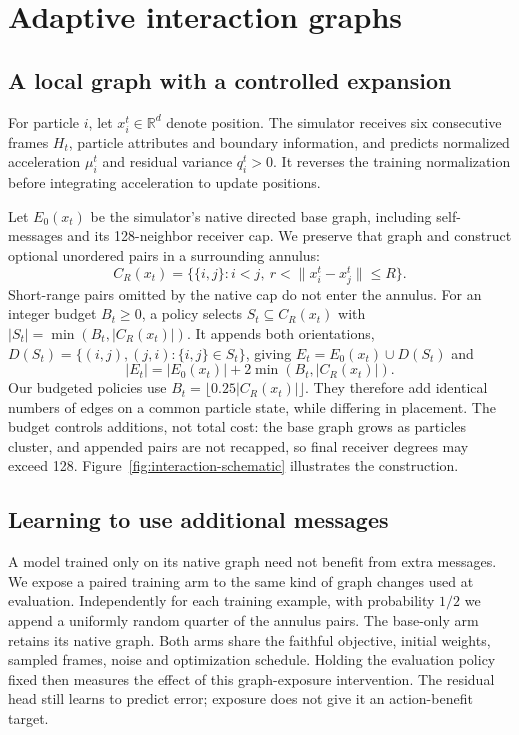 \section{Adaptive interaction graphs}
\subsection{A local graph with a controlled expansion}
For particle $i$, let $x_i^t\in\mathbb R^d$ denote position. The simulator receives six consecutive frames $H_t$, particle attributes and boundary information, and predicts normalized acceleration $\mu_i^t$ and residual variance $q_i^t>0$. It reverses the training normalization before integrating acceleration to update positions.

Let $E_0(x_t)$ be the simulator's native directed base graph, including self-messages and its 128-neighbor receiver cap. We preserve that graph and construct optional unordered pairs in a surrounding annulus:
\begin{equation}
 C_R(x_t)=\{\{i,j\}:i<j,\ r<\|x_i^t-x_j^t\|\le R\}.
\end{equation}
Short-range pairs omitted by the native cap do not enter the annulus. For an integer budget $B_t\ge0$, a policy selects $S_t\subseteq C_R(x_t)$ with $|S_t|=\min(B_t,|C_R(x_t)|)$. It appends both orientations, $D(S_t)=\{(i,j),(j,i):\{i,j\}\in S_t\}$, giving $E_t=E_0(x_t)\cup D(S_t)$ and
\begin{equation}
 |E_t|=|E_0(x_t)|+2\min(B_t,|C_R(x_t)|).
 \label{eq:budget}
\end{equation}
Our budgeted policies use $B_t=\lfloor0.25|C_R(x_t)|\rfloor$. They therefore add identical numbers of edges on a common particle state, while differing in placement. The budget controls additions, not total cost: the base graph grows as particles cluster, and appended pairs are not recapped, so final receiver degrees may exceed 128. Figure~\ref{fig:interaction-schematic} illustrates the construction.

\subsection{Learning to use additional messages}
A model trained only on its native graph need not benefit from extra messages. We expose a paired training arm to the same kind of graph changes used at evaluation. Independently for each training example, with probability $1/2$ we append a uniformly random quarter of the annulus pairs. The base-only arm retains its native graph. Both arms share the faithful objective, initial weights, sampled frames, noise and optimization schedule. Holding the evaluation policy fixed then measures the effect of this graph-exposure intervention. The residual head still learns to predict error; exposure does not give it an action-benefit target.

